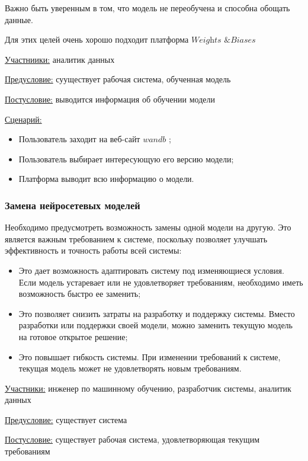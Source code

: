 Важно быть уверенным в том, что модель не переобучена и способна обощать данные.

Для этих целей очень хорошо подходит платформа $\textit{Weights \& Biases}$ \cite{wandb}

\underline{Участниики:} аналитик данных

\underline{Предусловие:} сууществует рабочая система, обученная модель

\underline{Постусловие:} выводится информация об обучении модели

\underline{Сценарий:}

\begin{itemize}
    \item Пользователь заходит на веб-сайт $wandb$ \cite{wandb};
    \item Пользователь выбирает интересующую его версию модели; 
    \item Платформа выводит всю информацию о модели.
\end{itemize}

\subsubsection{Замена нейросетевых моделей}

Необходимо предусмотреть возможность замены одной модели на другую. Это является важным требованием к системе, поскольку позволяет улучшать эффективность и точность работы всей системы:
\begin{itemize}
    \item Это дает возможность адаптировать систему под изменяющиеся условия. Если модель устаревает или не удовлетворяет требованиям, необходимо иметь возможность быстро ее заменить;
    \item Это позволяет снизить затраты на разработку и поддержку системы. Вместо разработки или поддержки своей модели, можно заменить текущую модель на готовое открытое решение;
    \item Это повышает гибкость системы. При изменении требований к системе, текущая модель может не удовлетворять новым требованиям.
\end{itemize}

\underline{Участники:} инженер по машинному обучению, разработчик системы, аналитик данных

\underline{Предусловие:} существует система

\underline{Постусловие:} существует рабочая система, удовлетворяющая текущим требованиям


